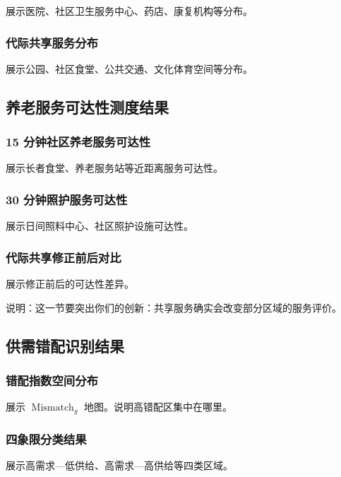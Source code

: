 \documentclass[UTF8,zihao=-4,a4paper,fontset=none]{ctexart}
\begin{document}
展示医院、社区卫生服务中心、药店、康复机构等分布。

\subsubsection{代际共享服务分布}

展示公园、社区食堂、公共交通、文化体育空间等分布。

\subsection{养老服务可达性测度结果}

\subsubsection{15 分钟社区养老服务可达性}

展示长者食堂、养老服务站等近距离服务可达性。

\subsubsection{30 分钟照护服务可达性}

展示日间照料中心、社区照护设施可达性。

\subsubsection{代际共享修正前后对比}

展示修正前后的可达性差异。

说明：这一节要突出你们的创新：共享服务确实会改变部分区域的服务评价。

\subsection{供需错配识别结果}

\subsubsection{错配指数空间分布}

展示 $\operatorname{Mismatch}_g$ 地图。说明高错配区集中在哪里。

\subsubsection{四象限分类结果}

展示高需求—低供给、高需求—高供给等四类区域。
\end{document}
